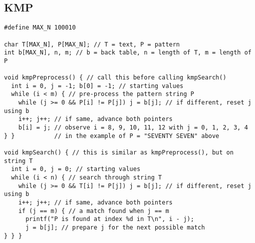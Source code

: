 \documentclass[letterpaper]{article}
\begin{document}
\subsection{KMP}
\begin{lstlisting}
#define MAX_N 100010

char T[MAX_N], P[MAX_N]; // T = text, P = pattern
int b[MAX_N], n, m; // b = back table, n = length of T, m = length of P

void kmpPreprocess() { // call this before calling kmpSearch()
  int i = 0, j = -1; b[0] = -1; // starting values
  while (i < m) { // pre-process the pattern string P
    while (j >= 0 && P[i] != P[j]) j = b[j]; // if different, reset j using b
    i++; j++; // if same, advance both pointers
    b[i] = j; // observe i = 8, 9, 10, 11, 12 with j = 0, 1, 2, 3, 4
} }           // in the example of P = "SEVENTY SEVEN" above

void kmpSearch() { // this is similar as kmpPreprocess(), but on string T
  int i = 0, j = 0; // starting values
  while (i < n) { // search through string T
    while (j >= 0 && T[i] != P[j]) j = b[j]; // if different, reset j using b
    i++; j++; // if same, advance both pointers
    if (j == m) { // a match found when j == m
      printf("P is found at index %d in T\n", i - j);
      j = b[j]; // prepare j for the next possible match
} } }
\end{lstlisting}
\end{document}
